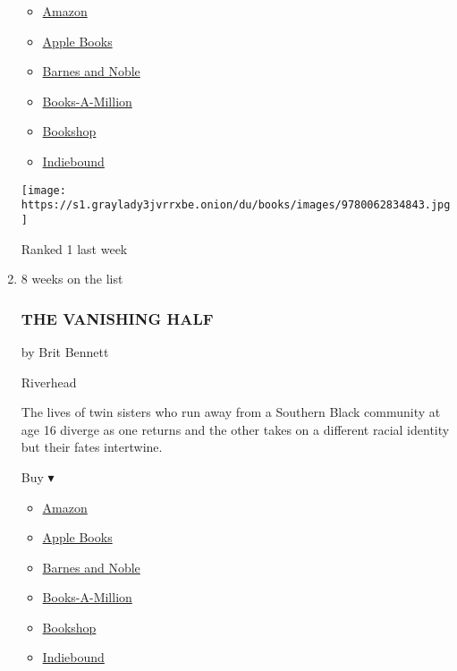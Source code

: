 \begin{enumerate}
  \begin{itemize}
  \tightlist
  \item
    \href{https://www.amazon.com/dp/0062834843?tag=NYTBSREV-20\&tag=NYTBS-20}{Amazon}
  \item
    \href{https://du-gae-books-dot-nyt-du-prd.appspot.com/buy?title=THE+ORDER\&author=Daniel+Silva}{Apple
    Books}
  \item
    \href{https://www.anrdoezrs.net/click-7990613-11819508?url=https\%3A\%2F\%2Fwww.barnesandnoble.com\%2Fw\%2F\%3Fean\%3D9780062834843}{Barnes
    and Noble}
  \item
    \href{https://www.anrdoezrs.net/click-7990613-35140?url=https\%3A\%2F\%2Fwww.booksamillion.com\%2Fp\%2FTHE\%2BORDER\%2FDaniel\%2BSilva\%2F9780062834843}{Books-A-Million}
  \item
    \href{https://bookshop.org/a/3546/9780062834843}{Bookshop}
  \item
    \href{https://www.indiebound.org/book/9780062834843?aff=NYT}{Indiebound}
  \end{itemize}

  \texttt{[image: https://s1.graylady3jvrrxbe.onion/du/books/images/9780062834843.jpg]}

  Ranked 1 last week
\item
  8 weeks on the list

  \hypertarget{the-vanishing-half}{%
  \subsubsection{THE VANISHING HALF}\label{the-vanishing-half}}

  by Brit Bennett

  Riverhead

  The lives of twin sisters who run away from a Southern Black community
  at age 16 diverge as one returns and the other takes on a different
  racial identity but their fates intertwine.

  Buy ▾

  \begin{itemize}
  \tightlist
  \item
    \href{https://www.amazon.com/dp/0525536299?tag=NYTBSREV-20\&tag=NYTBS-20}{Amazon}
  \item
    \href{https://du-gae-books-dot-nyt-du-prd.appspot.com/buy?title=THE+VANISHING+HALF\&author=Brit+Bennett}{Apple
    Books}
  \item
    \href{https://www.anrdoezrs.net/click-7990613-11819508?url=https\%3A\%2F\%2Fwww.barnesandnoble.com\%2Fw\%2F\%3Fean\%3D9780525536291}{Barnes
    and Noble}
  \item
    \href{https://www.anrdoezrs.net/click-7990613-35140?url=https\%3A\%2F\%2Fwww.booksamillion.com\%2Fp\%2FTHE\%2BVANISHING\%2BHALF\%2FBrit\%2BBennett\%2F9780525536291}{Books-A-Million}
  \item
    \href{https://bookshop.org/a/3546/9780525536291}{Bookshop}
  \item
    \href{https://www.indiebound.org/book/9780525536291?aff=NYT}{Indiebound}
  \end{itemize}


\end{enumerate}
